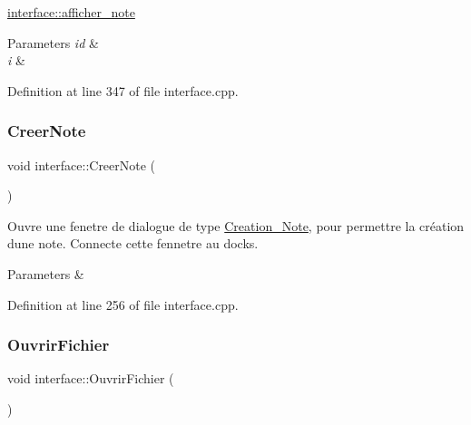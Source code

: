 \hyperlink{classinterface_a320051a7a36aa24f53b12df82649f15f}{interface\+::afficher\+\_\+note} 


\begin{DoxyParams}{Parameters}
{\em id} & \\
\hline
{\em i} & \\
\hline
\end{DoxyParams}


Definition at line 347 of file interface.\+cpp.

\mbox{\label{classinterface_a23957135caad59d8850fe8e2cbee28a3}} 
\subsubsection{\texorpdfstring{Creer\+Note}{CreerNote}}
{\footnotesize\ttfamily void interface\+::\+Creer\+Note (\begin{DoxyParamCaption}{ }\end{DoxyParamCaption})\hspace{0.3cm}{\ttfamily [slot]}}



Ouvre une fenetre de dialogue de type \hyperlink{class_creation___note}{Creation\+\_\+\+Note}, pour permettre la création d\textquotesingle{}une note. Connecte cette fennetre au docks. 


\begin{DoxyParams}{Parameters}
{\em } & \\
\hline
\end{DoxyParams}


Definition at line 256 of file interface.\+cpp.

\mbox{\label{classinterface_af42d8f6426ad19ce13f1dd2ce9f519c1}} 
\subsubsection{\texorpdfstring{Ouvrir\+Fichier}{OuvrirFichier}}
{\footnotesize\ttfamily void interface\+::\+Ouvrir\+Fichier (\begin{DoxyParamCaption}{ }\end{DoxyParamCaption})\hspace{0.3cm}{\ttfamily [slot]}}



